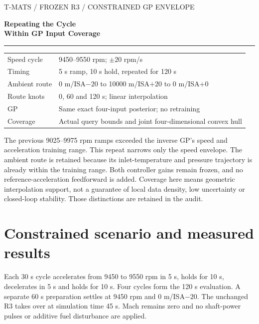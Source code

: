 \documentclass[11pt,a4paper]{article}
\begin{document}
\begin{titlepage}\color{navy}\sffamily
{\small T-MATS / FROZEN R3 / CONSTRAINED GP ENVELOPE}\par\vspace{22mm}
{\fontsize{30}{36}\selectfont\bfseries Repeating the Cycle\\Within GP Input Coverage\par}
\vspace{12mm}{\Large R3 versus base PI, with unchanged gains\par}
\vspace{10mm}\color{teal}\rule{\linewidth}{1.2pt}\color{navy}\vspace{8mm}
\begin{tabular}{ll}
Speed cycle & 9450--9550 rpm; $\pm20$ rpm/s\\[5pt]
Timing & 5 s ramp, 10 s hold, repeated for 120 s\\[5pt]
Ambient route & 0 m/ISA$-20$ to 10000 m/ISA$+20$ to 0 m/ISA$+0$\\[5pt]
Route knots & 0, 60 and 120 s; linear interpolation\\[5pt]
GP & Same exact four-input posterior; no retraining\\[5pt]
Coverage & Actual query bounds and joint four-dimensional convex hull
\end{tabular}
\par\vspace{12mm}\normalfont\color{ink}
The previous 9025--9975 rpm ramps exceeded the inverse GP's speed and acceleration training range. This repeat narrows only the speed envelope. The ambient route is retained because its inlet-temperature and pressure trajectory is already within the training range. Both controller gains remain frozen, and no reference-acceleration feedforward is added.
\vfill Coverage here means geometric interpolation support, not a guarantee of local data density, low uncertainty or closed-loop stability. Those distinctions are retained in the audit.
\end{titlepage}
\section{Constrained scenario and measured results}
Each 30 s cycle accelerates from 9450 to 9550 rpm in 5 s, holds for 10 s, decelerates in 5 s and holds for 10 s. Four cycles form the 120 s evaluation. A separate 60 s preparation settles at 9450 rpm and 0 m/ISA$-20$. The unchanged R3 takes over at simulation time 45 s. Mach remains zero and no shaft-power pulses or additive fuel disturbance are applied.
\end{document}
